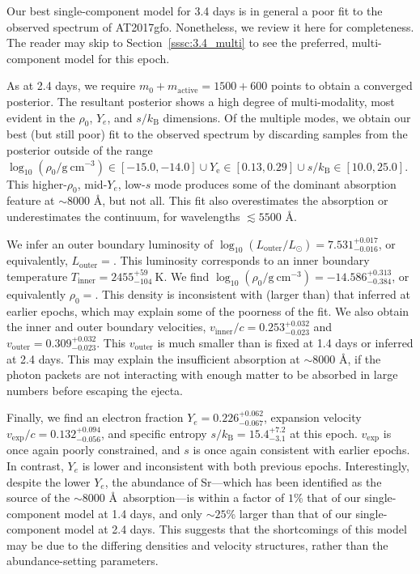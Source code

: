 \documentclass[twocolumn, twocolappendix]{aastex63}
\begin{document}
Our best single-component model for 3.4 days is in general a poor fit to the observed spectrum of AT2017gfo. Nonetheless, we review it here for completeness. The reader may skip to Section~\ref{sssc:3.4_multi} to see the preferred, multi-component model for this epoch. 

As at 2.4 days, we require $m_0 + m_{\mathrm{active}} = 1500 + 600$ points to obtain a converged posterior. The resultant posterior shows a high degree of multi-modality, most evident in the $\rho_0$, $Y_e$, and $s / k_{\mathrm{B}}$ dimensions. Of the multiple modes, we obtain our best (but still poor) fit to the observed spectrum by discarding samples from the posterior outside of the range $\log_{10}(\rho_0 / \mathrm{g~cm^{-3}}) \in [-15.0, -14.0] \cup Y_{\mathrm{e}} \in [0.13, 0.29] \cup s/k_{\mathrm{B}} \in [10.0, 25.0]$. This higher-$\rho_0$, mid-$Y_e$, low-$s$ mode produces some of the dominant absorption feature at $\sim8000$ \AA, but not all. This fit also overestimates the absorption or underestimates the continuum, for wavelengths $\lesssim 5500$ \AA. 

We infer an outer boundary luminosity of $\log_{10} (L_{\mathrm{outer}}/L_{\odot}) = 7.531^{+0.017}_{-0.016}$, or equivalently, $L_{\mathrm{outer}} = $. This luminosity corresponds to an inner boundary temperature $T_{\mathrm{inner}} = 2455^{+59}_{-104}~\mathrm{K}$. We find $\log_{10} (\rho_0 / \mathrm{g~cm^{-3}}) = -14.586^{+0.313}_{-0.384}$, or equivalently $\rho_0 = $. This density is inconsistent with (larger than) that inferred at earlier epochs, which may explain some of the poorness of the fit. We also obtain the inner and outer boundary velocities, $v_{\mathrm{inner}}/c = 0.253^{+0.032}_{-0.023}$ and $v_{\mathrm{outer}} = 0.309^{+0.032}_{-0.023}$. This $v_{\mathrm{outer}}$ is much smaller than is fixed at 1.4 days or inferred at 2.4 days. This may explain the insufficient absorption at $\sim8000$ \AA, if the photon packets are not interacting with enough matter to be absorbed in large numbers before escaping the ejecta.

Finally, we find an electron fraction $Y_e = 0.226^{+0.062}_{-0.067}$, expansion velocity $v_{\mathrm{exp}}/c = 0.132^{+0.094}_{-0.056}$, and specific entropy $s/k_{\mathrm{B}} = 15.4^{+7.2}_{-3.1}$ at this epoch. $v_{\mathrm{exp}}$ is once again poorly constrained, and $s$ is once again consistent with earlier epochs. In contrast, $Y_e$ is lower and inconsistent with both previous epochs. Interestingly, despite the lower $Y_e$, the abundance of Sr---which has been identified as the source of the $\sim 8000$ \AA~absorption---is within a factor of $1$\% that of our single-component model at 1.4 days, and only $\sim 25$\% larger than that of our single-component model at 2.4 days. This suggests that the shortcomings of this model may be due to the differing densities and velocity structures, rather than the abundance-setting parameters.
\end{document}
